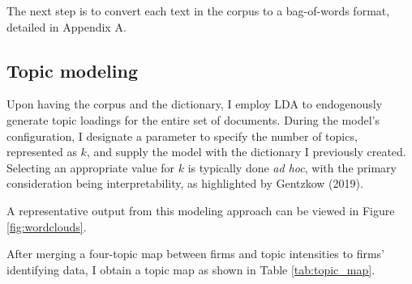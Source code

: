 \documentclass[12pt, letterpaper]{article}
\begin{document}
The next step is to convert each text in the corpus to a bag-of-words format, detailed in Appendix A.



 


%






\subsection{Topic modeling}

Upon having the corpus and the dictionary, I employ LDA to endogenously generate topic loadings for the entire set of documents. During the model's configuration, I designate a parameter to specify the number of topics, represented as \(k\), and supply the model with the dictionary I previously created. Selecting an appropriate value for \(k\) is typically done \textit{ad hoc}, with the primary consideration being interpretability, as highlighted by Gentzkow (2019).

A representative output from this modeling approach can be viewed in Figure \ref{fig:wordclouds}.



After merging a four-topic map between firms and topic intensities to firms' identifying data, I obtain a topic map as shown in Table \ref{tab:topic_map}.
\end{document}

